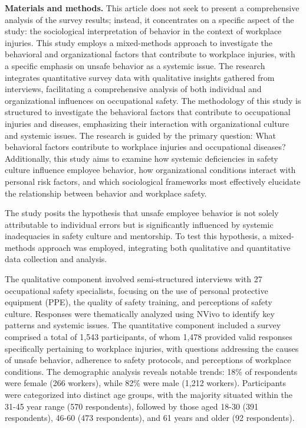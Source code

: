 \begin{multicols}{2}
{\bfseries Materials and methods.} This article does not seek to present a
comprehensive analysis of the survey results; instead, it concentrates
on a specific aspect of the study: the sociological interpretation of
behavior in the context of workplace injuries. This study employs a
mixed-methods approach to investigate the behavioral and organizational
factors that contribute to workplace injuries, with a specific emphasis
on unsafe behavior as a systemic issue. The research integrates
quantitative survey data with qualitative insights gathered from
interviews, facilitating a comprehensive analysis of both individual and
organizational influences on occupational safety. The methodology of
this study is structured to investigate the behavioral factors that
contribute to occupational injuries and diseases, emphasizing their
interaction with organizational culture and systemic issues. The
research is guided by the primary question: What behavioral factors
contribute to workplace injuries and occupational diseases?
Additionally, this study aims to examine how systemic deficiencies in
safety culture influence employee behavior, how organizational
conditions interact with personal risk factors, and which sociological
frameworks most effectively elucidate the relationship between behavior
and workplace safety.

The study posits the hypothesis that unsafe employee behavior is not
solely attributable to individual errors but is significantly influenced
by systemic inadequacies in safety culture and mentorship. To test this
hypothesis, a mixed-methods approach was employed, integrating both
qualitative and quantitative data collection and analysis.

The qualitative component involved semi-structured interviews with 27
occupational safety specialists, focusing on the use of personal
protective equipment (PPE), the quality of safety training, and
perceptions of safety culture. Responses were thematically analyzed
using NVivo to identify key patterns and systemic issues. The
quantitative component included a survey comprised a total of 1,543
participants, of whom 1,478 provided valid responses specifically
pertaining to workplace injuries, with questions addressing the causes
of unsafe behavior, adherence to safety protocols, and perceptions of
workplace conditions. The demographic analysis reveals notable trends:
18\% of respondents were female (266 workers), while 82\% were male
(1,212 workers). Participants were categorized into distinct age groups,
with the majority situated within the 31-45 year range (570
respondents), followed by those aged 18-30 (391 respondents), 46-60 (473
respondents), and 61 years and older (92 respondents).


\end{multicols}
